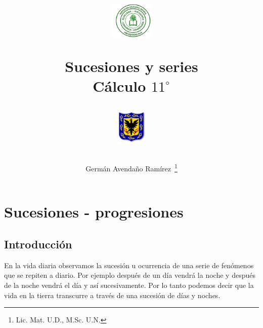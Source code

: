 \documentclass{article}
\author{Germ\'an Avenda\~no Ram\'irez~\thanks{Lic. Mat. U.D., M.Sc. U.N.}}
\title{\begin{minipage}{0.15\textwidth}\includegraphics[height=1.75cm]{Images/logo-colegio.png}
\end{minipage}\hfill \begin{minipage}{0.7\textwidth}\begin{center}
Sucesiones y series\\C\'{a}lculo  $11^{\circ}$\end{center}
\end{minipage}\hfill
\begin{minipage}{0.15\textwidth}
 \includegraphics[height=1.75cm]{Images/logo-sed.png} 
\end{minipage}}
\date{}
\begin{document}
\maketitle
\section*{Sucesiones - progresiones}
\subsection*{Introducci\'{o}n}
En la vida diaria observamos la sucesión u ocurrencia de una serie de fenómenos que se repiten a diario. Por ejemplo después de un día vendrá la noche y después de la noche vendrá el día y así sucesivamente. Por lo tanto podemos decir que la vida en la tierra transcurre a través de una sucesión de días y noches.\\
\end{document}
